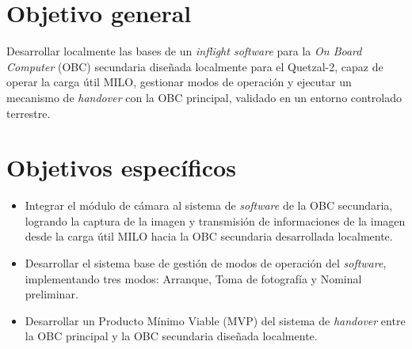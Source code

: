 \section{Objetivo general}
  Desarrollar localmente las bases de un \textit{inflight software} para la \textit{On Board Computer} (OBC) secundaria diseñada localmente para el Quetzal-2, capaz de operar la carga útil MILO, gestionar modos de operación y ejecutar un mecanismo de \textit{handover} con la OBC principal, validado en un entorno controlado terrestre.

\section{Objetivos específicos}
\begin{itemize}
	\item Integrar el módulo de cámara al sistema de \textit{software} de la OBC secundaria, logrando la captura de la imagen y transmisión de informaciones de la imagen desde la carga útil MILO hacia la OBC secundaria desarrollada localmente. 
	\item Desarrollar el sistema base de gestión de modos de operación del \textit{software}, implementando tres modos: Arranque, Toma de fotografía y Nominal preliminar.
	\item Desarrollar un Producto Mínimo Viable (MVP) del sistema de \textit{handover} entre la OBC principal y la OBC secundaria diseñada localmente.
\end{itemize}

